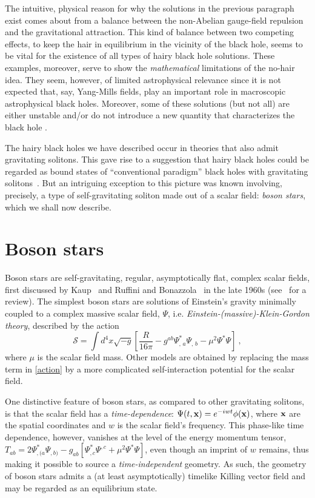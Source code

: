 The intuitive, physical reason for why the solutions in the previous paragraph exist comes about from a balance between the non-Abelian gauge-field repulsion and the gravitational attraction. This kind of balance between two competing effects, to keep the hair in equilibrium in the vicinity of the black hole, seems to be vital for the existence of all types of hairy black hole solutions. These examples, moreover, serve to show the \textit{mathematical} limitations of the no-hair idea. They seem, however, of limited astrophysical relevance since it is not expected that, say, Yang-Mills fields, play an important role in macroscopic astrophysical black holes. Moreover, some of these solutions (but not all) are  either unstable and/or do not introduce a new quantity that characterizes the black hole \cite{Mavromatos:1995fc}.

The hairy black holes we have described occur in theories that also admit gravitating solitons. This gave rise to a suggestion that hairy black holes could be regarded as bound states of ``conventional paradigm'' black holes with gravitating solitons~\cite{Ashtekar:2000nx}. But an intriguing exception to this picture was known involving, precisely, a type of self-gravitating soliton made out of a scalar field: \textit{boson stars}, which we shall now describe.





\section{Boson stars}
\label{sec:bs}
Boson stars are self-gravitating, regular, asymptotically flat, complex scalar fields, first discussed by Kaup~\cite{Kaup:1968zz} and Ruffini and Bonazzola~\cite{Ruffini:1969qy} in the late 1960s (see~\cite{Schunck:2003kk} for a review).
The simplest boson stars are solutions of Einstein's gravity minimally coupled to a complex massive scalar field, $\Psi$, i.e. \textit{Einstein-(massive)-Klein-Gordon theory}, described by the action
\begin{equation}
\mathcal{S}= \int  d^4x\sqrt{-g}\left[\frac{R }{16\pi }
   - g^{ab}\Psi_{, \, a}^* \Psi_{, \, b} - \mu^2 \Psi^*\Psi
 \right] \ ,
 \label{action}
 \end{equation}
where $\mu$ is the scalar field mass.
Other models are obtained by replacing the mass term in \eqref{action} by a more complicated self-interaction potential for the scalar field. 

One distinctive feature of boson stars, as compared to other gravitating solitons, is that the scalar field has a \textit{time-dependence}: $\Psi(t,{\bf x})=e^{-iwt}\phi({\bf x})$, where ${\bf x}$ are the spatial coordinates and $w$ is the scalar field's frequency.
This phase-like time dependence, however, vanishes at the level of the energy momentum tensor, $T_{ab}=2 \Psi_{ , (a}^*\Psi_{,b)}-g_{ab}  [  \Psi_{,c}^*\Psi^{,c}+\mu^2 \Psi^*\Psi]$, even though an imprint of $w$ remains, thus making it possible to source a \textit{time-independent} geometry.
As such, the geometry of boson stars admits a (at least asymptotically) timelike Killing vector field and may be regarded as an equilibrium state. 

